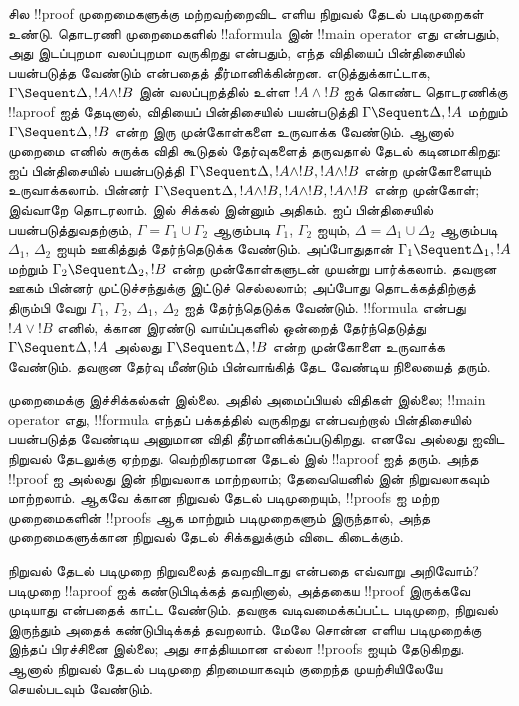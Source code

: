 \documentclass[../../../include/open-logic-section]{subfiles}
\begin{document}
சில !!{proof} முறைமைகளுக்கு மற்றவற்றைவிட எளிய
நிறுவல் தேடல் படிமுறைகள் உண்டு. தொடரணி முறைமைகளில்
!!a{formula} இன் !!{main operator} எது என்பதும்,
அது இடப்புறமா வலப்புறமா வருகிறது என்பதும்,
எந்த விதியைப் பின்திசையில் பயன்படுத்த வேண்டும் என்பதைத்
தீர்மானிக்கின்றன. எடுத்துக்காட்டாக,
$\Gamma \Sequent \Delta, !A \land !B$ இன்
வலப்புறத்தில் உள்ள $!A \land !B$ ஐக் கொண்ட
தொடரணிக்கு !!a{proof} ஐத் தேடினால்,
\RightR{\land} விதியைப் பின்திசையில் பயன்படுத்தி
$\Gamma \Sequent \Delta, !A$ மற்றும்
$\Gamma \Sequent \Delta, !B$ என்ற இரு முன்கோள்களை
உருவாக்க வேண்டும். ஆனால் முறைமை 
எனில் சுருக்க விதி கூடுதல் தேர்வுகளைத் தருவதால்
தேடல் கடினமாகிறது: \RightR{\Contraction} ஐப்
பின்திசையில் பயன்படுத்தி
$\Gamma \Sequent \Delta, !A \land !B, !A \land !B$
என்ற முன்கோளையும் உருவாக்கலாம். பின்னர்
$\Gamma \Sequent \Delta, !A \land !B, !A \land !B, !A \land !B$
என்ற முன்கோள்; இவ்வாறே தொடரலாம். 
இல் சிக்கல் இன்னும் அதிகம். \RightR{\land} ஐப்
பின்திசையில் பயன்படுத்துவதற்கும்,
$\Gamma = \Gamma_1 \cup \Gamma_2$ ஆகும்படி
$\Gamma_1$, $\Gamma_2$ ஐயும்,
$\Delta = \Delta_1 \cup \Delta_2$ ஆகும்படி
$\Delta_1$, $\Delta_2$ ஐயும் ஊகித்துத் தேர்ந்தெடுக்க
வேண்டும். அப்போதுதான்
$\Gamma_1 \Sequent \Delta_1, !A$ மற்றும்
$\Gamma_2 \Sequent \Delta_2, !B$ என்ற
முன்கோள்களுடன் முயன்று பார்க்கலாம். தவறான ஊகம்
பின்னர் முட்டுச்சந்துக்கு இட்டுச் செல்லலாம்; அப்போது
தொடக்கத்திற்குத் திரும்பி வேறு $\Gamma_1$,
$\Gamma_2$, $\Delta_1$, $\Delta_2$ ஐத்
தேர்ந்தெடுக்க வேண்டும். !!{formula} என்பது
$!A \lor !B$ எனில், \RightR{\lor} க்கான
இரண்டு வாய்ப்புகளில் ஒன்றைத் தேர்ந்தெடுத்து
$\Gamma \Sequent \Delta, !A$ அல்லது
$\Gamma \Sequent \Delta, !B$ என்ற முன்கோளை
உருவாக்க வேண்டும். தவறான தேர்வு மீண்டும்
பின்வாங்கித் தேட வேண்டிய நிலையைத் தரும்.

 முறைமைக்கு இச்சிக்கல்கள் இல்லை. அதில்
அமைப்பியல் விதிகள் இல்லை; !!{main operator} எது,
!!{formula} எந்தப் பக்கத்தில் வருகிறது என்பவற்றால்
பின்திசையில் பயன்படுத்த வேண்டிய அனுமான விதி
தீர்மானிக்கப்படுகிறது. எனவே  அல்லது
 ஐவிட  நிறுவல் தேடலுக்கு
ஏற்றது. வெற்றிகரமான தேடல்  இல்
!!a{proof} ஐத் தரும். அந்த !!{proof} ஐ
 அல்லது  இன்
நிறுவலாக மாற்றலாம்; தேவையெனில்
 இன் நிறுவலாகவும் மாற்றலாம்.
ஆகவே  க்கான நிறுவல் தேடல் படிமுறையும்,
 !!{proof}s ஐ மற்ற முறைமைகளின்
!!{proof}s ஆக மாற்றும் படிமுறைகளும் இருந்தால்,
அந்த முறைமைகளுக்கான நிறுவல் தேடல் சிக்கலுக்கும்
விடை கிடைக்கும்.

நிறுவல் தேடல் படிமுறை நிறுவலைத் தவறவிடாது
என்பதை எவ்வாறு அறிவோம்? படிமுறை !!a{proof} ஐக்
கண்டுபிடிக்கத் தவறினால், அத்தகைய !!{proof}
இருக்கவே முடியாது என்பதைக் காட்ட வேண்டும்.
தவறாக வடிவமைக்கப்பட்ட படிமுறை, நிறுவல் இருந்தும்
அதைக் கண்டுபிடிக்கத் தவறலாம். மேலே சொன்ன
எளிய படிமுறைக்கு இந்தப் பிரச்சினை இல்லை;
அது சாத்தியமான எல்லா !!{proof}s ஐயும் தேடுகிறது.
ஆனால் நிறுவல் தேடல் படிமுறை திறமையாகவும்
குறைந்த முயற்சியிலேயே செயல்படவும் வேண்டும்.
\end{document}
